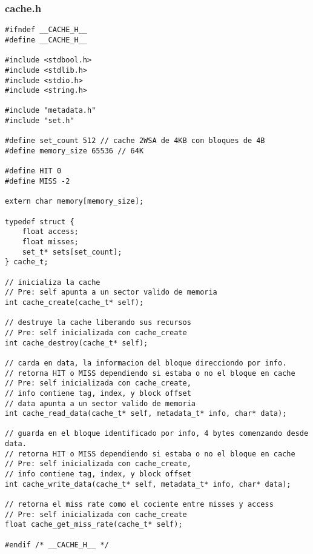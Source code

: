 \documentclass[a4paper,10pt]{article}
\begin{document}
  \subsubsection{cache.h}
  \begin{verbatim}
#ifndef __CACHE_H__
#define __CACHE_H__

#include <stdbool.h>
#include <stdlib.h>
#include <stdio.h>
#include <string.h>

#include "metadata.h"
#include "set.h"

#define set_count 512 // cache 2WSA de 4KB con bloques de 4B
#define memory_size 65536 // 64K

#define HIT 0
#define MISS -2

extern char memory[memory_size];

typedef struct {
	float access;
	float misses;
	set_t* sets[set_count];
} cache_t;

// inicializa la cache
// Pre: self apunta a un sector valido de memoria
int cache_create(cache_t* self);

// destruye la cache liberando sus recursos
// Pre: self inicializada con cache_create
int cache_destroy(cache_t* self);

// carda en data, la informacion del bloque direcciondo por info.
// retorna HIT o MISS dependiendo si estaba o no el bloque en cache
// Pre: self inicializada con cache_create,
// info contiene tag, index, y block offset
// data apunta a un sector valido de memoria
int cache_read_data(cache_t* self, metadata_t* info, char* data);

// guarda en el bloque identificado por info, 4 bytes comenzando desde data.
// retorna HIT o MISS dependiendo si estaba o no el bloque en cache
// Pre: self inicializada con cache_create,
// info contiene tag, index, y block offset
int cache_write_data(cache_t* self, metadata_t* info, char* data);

// retorna el miss rate como el cociente entre misses y access
// Pre: self inicializada con cache_create
float cache_get_miss_rate(cache_t* self);

#endif /* __CACHE_H__ */
  \end{verbatim}
\end{document}
